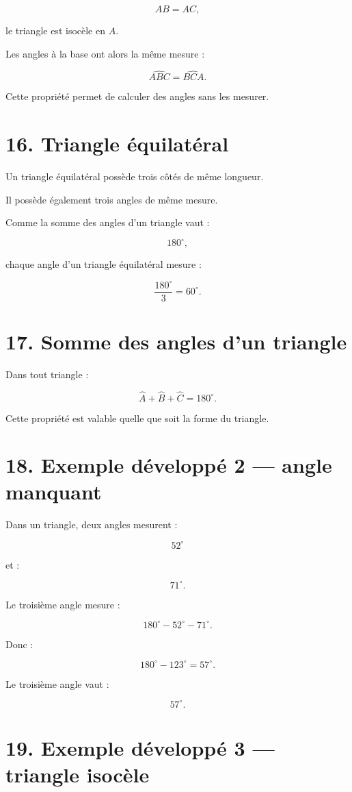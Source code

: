 \[
AB=AC,
\]

le triangle est isocèle en $A$.

Les angles à la base ont alors la même mesure :

\[
\widehat{ABC}
=
\widehat{BCA}.
\]

Cette propriété permet de calculer des angles sans les mesurer.

\section{16. Triangle équilatéral}

Un triangle équilatéral possède trois côtés de même longueur.

Il possède également trois angles de même mesure.

Comme la somme des angles d’un triangle vaut :

\[
180^\circ,
\]

chaque angle d’un triangle équilatéral mesure :

\[
\dfrac{180^\circ}{3}=60^\circ.
\]

\section{17. Somme des angles d’un triangle}

Dans tout triangle :

\[
\boxed{
\widehat{A}
+
\widehat{B}
+
\widehat{C}
=
180^\circ
}.
\]

Cette propriété est valable quelle que soit la forme du triangle.

\section{18. Exemple développé 2 — angle manquant}

Dans un triangle, deux angles mesurent :

\[
52^\circ
\]

et :

\[
71^\circ.
\]

Le troisième angle mesure :

\[
180^\circ-52^\circ-71^\circ.
\]

Donc :

\[
180^\circ-123^\circ=57^\circ.
\]

Le troisième angle vaut :

\[
\boxed{57^\circ}.
\]

\section{19. Exemple développé 3 — triangle isocèle}

